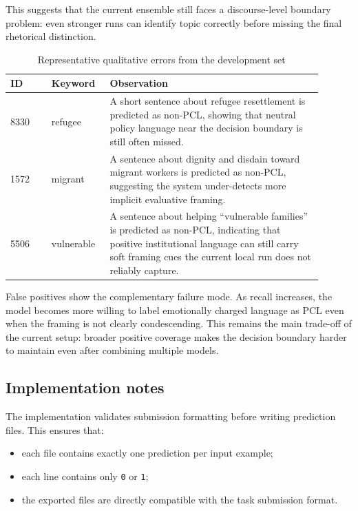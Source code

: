 \documentclass[11pt]{article}
\begin{document}
    This suggests that the current ensemble still faces a discourse-level
    boundary problem: even stronger runs can identify topic correctly before
    missing the final rhetorical distinction.

    \begin{table}[H]
    \centering
    \caption{Representative qualitative errors from the development set}
    \label{tab:error-examples}
    \begin{tabular}{p{0.12\linewidth} p{0.16\linewidth} p{0.62\linewidth}}
    \toprule
    ID & Keyword & Observation \\
    \midrule
    8330 & refugee & A short sentence about refugee resettlement is predicted as non-PCL, showing that neutral policy language near the decision boundary is still often missed. \\
    1572 & migrant & A sentence about dignity and disdain toward migrant workers is predicted as non-PCL, suggesting the system under-detects more implicit evaluative framing. \\
    5506 & vulnerable & A sentence about helping ``vulnerable families'' is predicted as non-PCL, indicating that positive institutional language can still carry soft framing cues the current local run does not reliably capture. \\
    \bottomrule
    \end{tabular}
    \end{table}

    False positives show the complementary failure mode. As recall increases,
    the model becomes more willing to label emotionally charged language as PCL
    even when the framing is not clearly condescending. This remains the main
    trade-off of the current setup: broader positive coverage makes the
    decision boundary harder to maintain even after combining multiple models.

    \subsection{Implementation notes}
    The implementation validates submission formatting before writing
    prediction files. This ensures that:
    \begin{itemize}[leftmargin=1.5em]
    \item each file contains exactly one prediction per input example;
    \item each line contains only \texttt{0} or \texttt{1};
    \item the exported files are directly compatible with the task submission
    format.
    \end{itemize}
\end{document}
